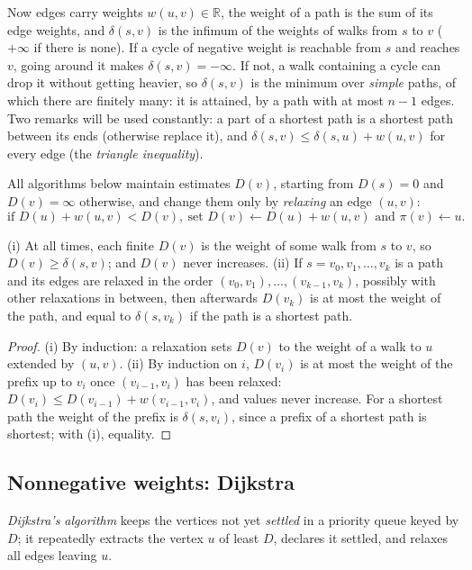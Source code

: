 Now edges carry weights $w(u,v)\in\mathbb R$, the weight of a path is the sum of its edge weights, and $\delta(s,v)$ is the infimum of the weights of walks from $s$ to $v$ ($+\infty$ if there is none).
If a cycle of negative weight is reachable from $s$ and reaches $v$, going around it makes $\delta(s,v)=-\infty$. If not, a walk containing a cycle can drop it without getting heavier, so $\delta(s,v)$ is
the minimum over \emph{simple} paths, of which there are finitely many: it is attained, by a path with at most $n-1$ edges. Two remarks will be used constantly: a part of a shortest path is a shortest path between
its ends (otherwise replace it), and $\delta(s,v)\le\delta(s,u)+w(u,v)$ for every edge (the \emph{triangle inequality}).

All algorithms below maintain estimates $D(v)$, starting from $D(s)=0$ and $D(v)=\infty$ otherwise, and change them only by \emph{relaxing} an edge $(u,v)$:
\[
\text{if } D(u)+w(u,v)<D(v),\ \text{set } D(v)\gets D(u)+w(u,v) \text{ and } \pi(v)\gets u.
\]

\begin{lemma}[relaxation]\label{lem:relax}
(i) At all times, each finite $D(v)$ is the weight of some walk from $s$ to $v$, so $D(v)\ge\delta(s,v)$; and $D(v)$ never increases.
(ii) If $s=v_0,v_1,\dots,v_k$ is a path and its edges are relaxed in the order $(v_0,v_1),\dots,(v_{k-1},v_k)$, possibly with other relaxations in between, then afterwards $D(v_k)$ is at most the weight of the path,
and equal to $\delta(s,v_k)$ if the path is a shortest path.
\end{lemma}
\begin{proof}
(i) By induction: a relaxation sets $D(v)$ to the weight of a walk to $u$ extended by $(u,v)$. (ii) By induction on $i$, $D(v_i)$ is at most the weight of the prefix up to $v_i$ once $(v_{i-1},v_i)$ has been relaxed: $D(v_i)\le D(v_{i-1})+w(v_{i-1},v_i)$, and values never increase. For a shortest path
the weight of the prefix is $\delta(s,v_i)$, since a prefix of a shortest path is shortest; with (i), equality.
\end{proof}

\subsection*{Nonnegative weights: Dijkstra}

\emph{Dijkstra's algorithm} keeps the vertices not yet \emph{settled} in a priority queue keyed by $D$; it repeatedly extracts the vertex $u$ of least $D$, declares it settled, and relaxes all edges leaving $u$.

